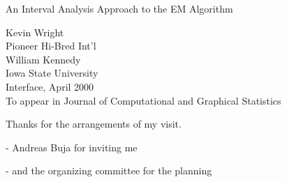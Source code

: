 \documentclass{slides}
\begin{document}
\def\bfw{ {\bf w}}
\def\bfx{{\bf x}}
\def\bfy{{\bf y}}
\def\bfOmega{\mbox{\boldmath $\Omega$}}
\def\bfphi{\mbox{\boldmath $\phi$}}
\def\bfPhi{\mbox{\boldmath $\Phi$}}
\def\bfpi{\mbox{\boldmath $\pi$}}
\def\bfmu{\mbox{\boldmath $\mu$}}
\def\bfPhi{\mbox{\boldmath $\Phi$}}
\def\bs{\begin{slide}}
\def\es{\end{slide}}

\begin{slide}
\begin{center}

An Interval Analysis Approach to the EM Algorithm \\
\vspace{1 in}

Kevin Wright \\
Pioneer Hi-Bred Int'l\\
\vspace{0.5 in}
William Kennedy\\
Iowa State University\\

\vspace{1 in}
Interface, April 2000\\

\vspace{.5 in}
To appear in Journal of Computational and Graphical Statistics\\

\end{center}
\end{slide}
\begin{note}
Thanks for the arrangements of my visit.

- Andreas Buja for inviting me

- and the organizing committee for the planning

\end{note}
\end{document}
